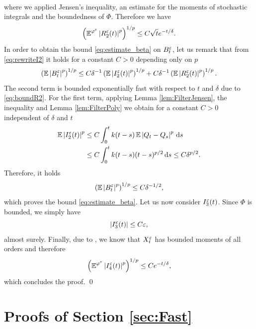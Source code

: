 \documentclass[10pt]{article}
\begin{document}
\begin{appendices}
\begin{equation}
\begin{aligned}
	\end{aligned}
	\end{equation}
	where we applied Jensen's inequality, an estimate for the moments of stochastic integrals \cite[Formula (3.25), p. 163]{KaS91} and the boundedness of $\Phi$. Therefore we have
	\begin{equation}\label{eq:boundR2}
		\left( \operatorname{\mathbb{E}}^{\varphi^\varepsilon}\left\lvert R_2^\varepsilon(t)\right\rvert^p \right)^{1/p} \leq C \sqrt{t} e^{-t/\delta}.
	\end{equation}
	In order to obtain the bound \eqref{eq:estimate_beta} on $B_t^\varepsilon$, let us remark that from \eqref{eq:rewriteI2} it holds for a constant $C > 0$ depending only on $p$ 
	\begin{equation}
		\left(\operatorname{\mathbb{E}}\left\lvert B_t^\varepsilon\right\rvert^p\right)^{1/p}\leq C \delta^{-1}\left(\operatorname{\mathbb{E}}\left\lvert I_2^\varepsilon(t)\right\rvert^p\right)^{1/p} + C \delta^{-1} \left(\operatorname{\mathbb{E}}\left\lvert R_2^\varepsilon(t)\right\rvert^p\right)^{1/p}.
	\end{equation}
	The second term is bounded exponentially fast with respect to $t$ and $\delta$ due to \eqref{eq:boundR2}. For the first term, applying Lemma \ref{lem:FilterJensen}, the inequality \cite[Formula (3.25), p. 163]{KaS91} and Lemma \ref{lem:FilterPoly} we obtain for a constant $C > 0$ independent of $\delta$ and $t$
	\begin{equation}
	\begin{aligned}
		\operatorname{\mathbb{E}}\left\lvert I_2^\varepsilon(t)\right\rvert^p &\leq C \int_0^t k(t-s) \operatorname{\mathbb{E}}\left\lvert Q_t - Q_s\right\rvert^p \,\mathrm{d} s \\
		&\leq C\int_0^t k(t-s)(t-s)^{p/2} \,\mathrm{d} s \leq C\delta^{p/2}.
	\end{aligned}
	\end{equation} 
	Therefore, it holds
	\begin{equation}
		\left(\operatorname{\mathbb{E}}\left\lvert B_t^\varepsilon\right\rvert^p\right)^{1/p}\leq C \delta^{-1/2},
	\end{equation}
	which proves the bound \eqref{eq:estimate_beta}. Let us now consider $I_3^\varepsilon(t)$. Since $\Phi$ is bounded, we simply have
	\begin{equation}
	\left\lvert I_3^\varepsilon(t)\right\rvert \leq C \varepsilon, 
	\end{equation}
	almost surely. Finally, due to \cite[Corollary 5.4]{PaS07}, we know that $X_t^\varepsilon$ has bounded moments of all orders and therefore
	\begin{equation}
	\left(\operatorname{\mathbb{E}}^{\varphi^\varepsilon} \left\lvert I_4^\varepsilon(t)\right\rvert^p\right)^{1/p} \leq C e^{-t/\delta},
	\end{equation}
	which concludes the proof. \qed

\section{Proofs of Section \ref{sec:Fast}} \label{ap:ProofsDeltaZeta}


\end{appendices}
\end{document}
